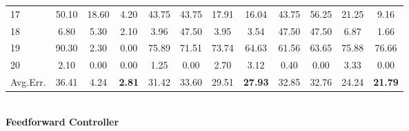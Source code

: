 \documentclass[landscape,a0paper,fontscale=0.285,final]{baposter} %
\begin{document}
\begin{poster}
{{\begin{minipage}[t]{0.94\linewidth}
\begin{tabular}{ | l || c | c | c || c |c |c|c|| c | c | c|c| }
17 & 50.10 & 18.60 & 4.20 & 43.75 & 43.75 & 17.91 & 16.04 & 43.75 & 56.25 & 21.25 & 9.16\\
18 & 6.80 & 5.30 & 2.10 & 3.96 & 47.50 & 3.95 & 3.54 & 47.50 & 47.50 & 6.87 & 1.66\\
19 & 90.30 & 2.30 & 0.00 & 75.89 & 71.51 & 73.74 & 64.63 & 61.56 & 63.65 & 75.88 & 76.66\\
20 & 2.10 & 0.00 & 0.00 & 1.25 & 0.00 & 2.70 & 3.12 & 0.40 & 0.00 & 3.33 & 0.00\\\hline
Avg.Err. & 36.41 & 4.24 & \textbf{2.81} & 31.42 & 33.60 & 29.51 & \textbf{27.93} & 32.85 & 32.76 & 24.24 & \textbf{21.79}\\\hline
\end{tabular}
\end{minipage}}

~\\ {\bf Feedforward Controller \\}

}
\end{poster}
\end{document}
